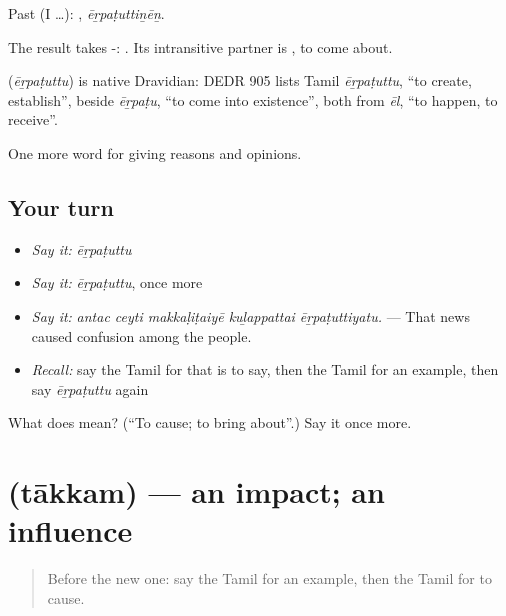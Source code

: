 Past (I …): , \emph{ēṟpaṭuttiṉēṉ}.

The result takes -:  . Its intransitive partner is , to come about.

\begin{cousinweb}
\textbf{} (\emph{ēṟpaṭuttu}) is native Dravidian: DEDR 905 lists Tamil \emph{ēṟpaṭuttu}, \textquotedblleft{}to create, establish\textquotedblright{}, beside \emph{ēṟpaṭu}, \textquotedblleft{}to come into existence\textquotedblright{}, both from \emph{ēl}, \textquotedblleft{}to happen, to receive\textquotedblright{}.
\end{cousinweb}

\begin{grammarlens}[title={What you've built}]
One more word for giving reasons and opinions.
\end{grammarlens}

\subsection*{Your turn}
\begin{itemize}
\raggedright
  \item \emph{Say it:} \emph{ēṟpaṭuttu}
  \item \emph{Say it:} \emph{ēṟpaṭuttu}, once more
  \item \emph{Say it:} \emph{antac ceyti makkaḷiṭaiyē kuḻappattai ēṟpaṭuttiyatu.} — That news caused confusion among the people.
  \item \emph{Recall:} say the Tamil for that is to say, then the Tamil for an example, then say \emph{ēṟpaṭuttu} again
\end{itemize}

\begin{tcolorbox}[breakable,colback=teal!4,colframe=teal!35!black,title={Before you move on}]
What does  mean? (\textquotedblleft{}To cause; to bring about\textquotedblright{}.) Say it once more.
\end{tcolorbox}
\section[\texorpdfstring{\ta{தாக்கம்} (tākkam)}{தாக்கம் (tākkam)}]{ (tākkam) — an impact; an influence}

\label{lesson:TA-C352-takkam}



\begin{quote}
Before the new one: say the Tamil for an example, then the Tamil for to cause.
\end{quote}

